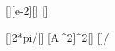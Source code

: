 [\cm][e-2][\meter]
[\second]

[]{2*pi/\TX}[\per\second]
[A\,\omega^2]{\AX*\omX^2}[\mpss]
[]{\amaxX/\ncgX}
